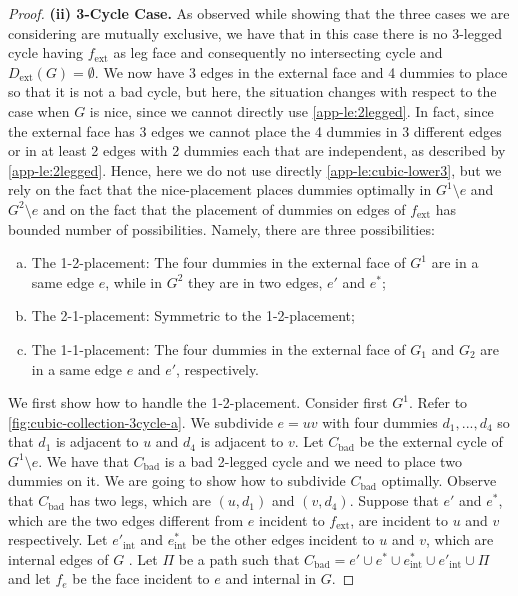 \documentclass[runningheads]{llncs}
\newcommand{\ext}{\operatorname{ext}}
\newcommand{\bad}{\operatorname{bad}}
\begin{document}
\begin{proof}
\smallskip
\noindent
{\sffamily\bfseries (ii) 3-Cycle Case.} As observed while showing that the three cases we are considering are mutually exclusive, we have that in this case there is no 3-legged cycle having $f_{\ext}$ as leg face and consequently no intersecting cycle and $D_{\ext}(G)=\emptyset$.   We now have 3 edges in the external face and 4 dummies to place so that it is not a bad cycle, but here, the situation changes with respect to the case when $G$ is nice, since we cannot directly use \cref{app-le:2legged}. In fact, since the external face has 3 edges we cannot place the 4 dummies in 3 different edges or in at least 2 edges with 2 dummies each that are independent, as described by \cref{app-le:2legged}. Hence, here we do not use directly \cref{app-le:cubic-lower3}, but we rely on the fact that the nice-placement places dummies optimally in $G^1\setminus e$ and $G^2\setminus e$ and on the fact that the placement of dummies on edges of $f_{\ext}$ has bounded number of possibilities. Namely, there are three possibilities: 
\begin{enumerate}[(a)]
\item The 1-2-placement: The four dummies in the external face of $G^1$ are in a same edge $e$, while in $G^2$ they are in two edges, $e'$ and $e^*$; 
\item The 2-1-placement: Symmetric to the 1-2-placement;
\item The 1-1-placement: The four dummies in the external face of $G_1$ and $G_2$  are in a same edge $e$ and $e'$, respectively. 
\end{enumerate}
We first show how to handle the 1-2-placement. Consider first $G^1$. Refer to \cref{fig:cubic-collection-3cycle-a}. We subdivide $e=uv$ with four dummies $d_1,...,d_4$ so that $d_1$ is adjacent to $u$ and $d_4$ is adjacent to $v$. Let $C_{\bad}$ be the external cycle of $G^1\setminus e$. We have that $C_{\bad}$ is a bad 2-legged cycle and we need to place two dummies on it. We are going to show how to subdivide $C_{\bad}$ optimally. Observe that $C_{\bad}$ has two legs, which are $(u,d_1)$ and $(v,d_4)$. Suppose that $e'$ and $e^*$, which are the two edges different from $e$ incident to $f_{\ext}$, are incident to $u$ and $v$ respectively. Let $e'_{\mathrm{int}}$ and $e^*_{\mathrm{int}}$ be the other edges incident to $u$ and $v$, which are internal edges of $G$ . Let $\Pi$ be a path such that $C_{\bad}=e'\cup e^*\cup e^*_{\mathrm{int}} \cup e'_{\mathrm{int}} \cup \Pi$ and let $f_e$ be the face incident to $e$ and internal in $G$. 


\end{proof}
\end{document}
